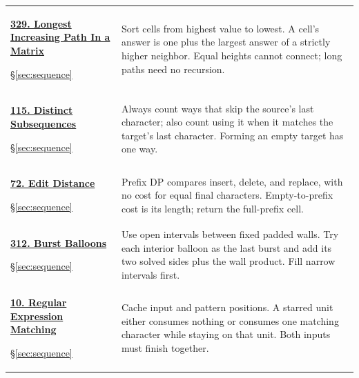\documentclass[11pt]{article}
\newcommand{\sect}[1]{\hyperref[sec:#1]{\S\ref*{sec:#1}}}
\begin{document}
\begin{longtable}{@{}L{4.3cm}L{11.7cm}@{}}
\hypertarget{lc329}{}\href{https://leetcode.com/problems/longest-increasing-path-in-a-matrix/}{\textbf{329. Longest Increasing Path In a Matrix}}\par\sect{sequence} & Sort cells from highest value to lowest. A cell's answer is one plus the largest answer of a strictly higher neighbor. Equal heights cannot connect; long paths need no recursion.\\[4pt]
\hypertarget{lc115}{}\href{https://leetcode.com/problems/distinct-subsequences/}{\textbf{115. Distinct Subsequences}}\par\sect{sequence} & Always count ways that skip the source's last character; also count using it when it matches the target's last character. Forming an empty target has one way.\\[4pt]
\hypertarget{lc72}{}\href{https://leetcode.com/problems/edit-distance/}{\textbf{72. Edit Distance}}\par\sect{sequence} & Prefix DP compares insert, delete, and replace, with no cost for equal final characters. Empty-to-prefix cost is its length; return the full-prefix cell.\\[4pt]
\hypertarget{lc312}{}\href{https://leetcode.com/problems/burst-balloons/}{\textbf{312. Burst Balloons}}\par\sect{sequence} & Use open intervals between fixed padded walls. Try each interior balloon as the last burst and add its two solved sides plus the wall product. Fill narrow intervals first.\\[4pt]
\hypertarget{lc10}{}\href{https://leetcode.com/problems/regular-expression-matching/}{\textbf{10. Regular Expression Matching}}\par\sect{sequence} & Cache input and pattern positions. A starred unit either consumes nothing or consumes one matching character while staying on that unit. Both inputs must finish together.\\[4pt]
\bottomrule
\end{longtable}
\end{document}
